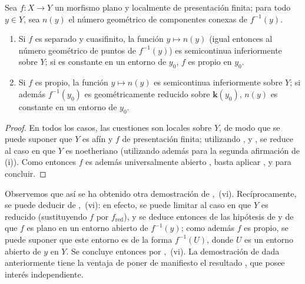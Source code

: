 
\begin{proposition}[15.5.9]
\label{IV.15.5.9}
Sea $f:X\to Y$ un morfismo plano y localmente de presentación finita; para todo $y\in Y$, sea $n(y)$ el número geométrico de componentes conexas de $f^{-1}(y)$.
\begin{enumerate}[label=(\roman*)]
  \item Si $f$ es separado y cuasifinito, la función $y\mapsto n(y)$ \textup{(igual entonces al número geométrico de puntos de $f^{-1}(y)$)} es semicontinua inferiormente sobre $Y$; si es constante en un entorno de $y_0$, $f$ es propio en $y_0$.
  \item Si $f$ es propio, la función $y\mapsto n(y)$ es semicontinua inferiormente sobre $Y$; si además $f^{-1}(y_0)$ es geométricamente reducido sobre $\boldsymbol{k}(y_0)$, $n(y)$ es constante en un entorno de $y_0$.
\end{enumerate}
\end{proposition}

\begin{proof}
En todos los casos, las cuestiones son locales sobre $Y$, de modo que se puede suponer que $Y$ es afín y $f$ de presentación finita; utilizando ,  y , se reduce al caso en que $Y$ es noetheriano (utilizando además  para la segunda afirmación de (i)).
Como entonces $f$ es además universalmente abierto , basta aplicar ,  y  para concluir.
\end{proof}

\begin{remarks}[15.5.10]
\label{IV.15.5.10}
Observemos que así se ha obtenido otra demostración de ,~(vi).
Recíprocamente, se puede deducir  de ,~(vi): en efecto, se puede limitar al caso en que $Y$ es reducido (sustituyendo $f$ por $f_\mathrm{red}$), y se deduce entonces de las hipótesis de  y de  que $f$ es plano en un entorno abierto de $f^{-1}(y)$; como además $f$ es propio, se puede suponer que este entorno es de la forma $f^{-1}(U)$, donde $U$ es un entorno abierto de $y$ en $Y$.
Se concluye entonces por ,~(vi).
La demostración de  dada anteriormente tiene la ventaja de poner de manifiesto el resultado , que posee interés independiente.
\end{remarks}


